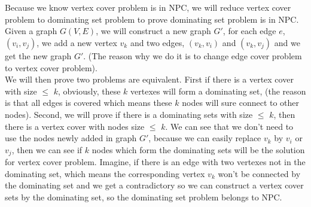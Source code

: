 \documentclass[11pt]{article}
\begin{document}
\part{}
    Because we know vertex cover problem is in NPC, we will reduce vertex cover problem to dominating set problem to prove dominating set problem is in NPC. \\
    Given a graph $G(V,E)$, we will construct a new graph $G'$, for each edge $e$, $(v_{i},v_{j})$, we add a new vertex $v_{k}$ and two edges, $(v_{k},v_{i})$ and $(v_{k},v_{j})$ and we get the new graph $G'$. (The reason why we do it is to change edge cover problem to vertex cover problem). \\
    We will then prove two problems are equivalent. First if there is a vertex cover with size $\leq$ $k$, obviously, these $k$ vertexes will form a dominating set, (the reason is that all edges is covered which means these $k$ nodes will sure connect to other nodes). Second, we will prove if there is a dominating sets with size $\leq$ $k$, then there is a vertex cover with nodes size $\leq$ $k$. We can see that we don't need to use the nodes newly added in graph $G'$, because we can easily replace $v_{k}$ by $v_{i}$ or $v_{j}$, then we can see if $k$ nodes which form the dominating sets will be the solution for vertex cover problem. Imagine, if there is an edge with two vertexes not in the dominating set, which means the corresponding vertex $v_{k}$ won't be connected by the dominating set and we get a contradictory so we can construct a vertex cover sets by the dominating set, so the dominating set problem belongs to NPC.
\end{document}
